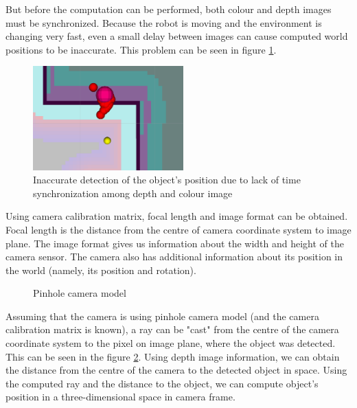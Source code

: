 \documentclass[12pt,a4paper]{article}
\begin{document}
	But before the computation can be performed, both colour and depth images must be synchronized. Because the robot is moving and the environment is changing very fast, even a small delay between images can cause computed world positions to be inaccurate. This problem can be seen in figure \ref{fig:non_synchronized_raw_detection}. \\ 
	
	\begin{figure}[h]
		\centering
		\includegraphics[height=4cm]{images/detections}
		\caption{Inaccurate detection of the object's position due to lack of time synchronization among depth and colour image}
		\label{fig:non_synchronized_raw_detection}
	\end{figure}

	Using camera calibration matrix, focal length and image format can be obtained. Focal length is the distance from the centre of camera coordinate system to image plane. The image format gives us information about the width and height of the camera sensor. The camera also has additional information about its position in the world (namely, its position and rotation). \\

	\begin{figure}[h]
		\centering
		\caption{Pinhole camera model}
		\label{fig:pinhole_camera_model}
	\end{figure}
	
	
	Assuming that the camera is using pinhole camera model (and the camera calibration matrix is known), a ray can be "cast" from the centre of the camera coordinate system to the pixel on image plane, where the object was detected. This can be seen in the figure \ref{fig:pinhole_camera_model}. Using depth image information, we can obtain the distance from the centre of the camera to the detected object in space. Using the computed ray and the distance to the object, we can compute object's position in a three-dimensional space in camera frame. \\
	
\end{document}
